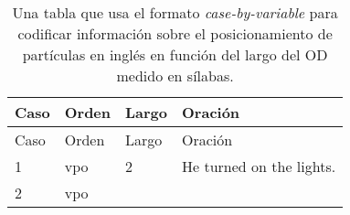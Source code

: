 \documentclass[authoryear,a4paper, 14pt]{scrartcl}
\begin{document}
\begin{longtable}[]{@{}llll@{}}
\caption{Una tabla que usa el formato \emph{case-by-variable} para codificar información sobre el
posicionamiento de partículas en inglés en función del largo del OD
medido en sílabas.}\tabularnewline
\toprule
\begin{minipage}[b]{0.08\columnwidth}\raggedright
Caso\strut
\end{minipage} & \begin{minipage}[b]{0.09\columnwidth}\raggedright
Orden\strut
\end{minipage} & \begin{minipage}[b]{0.09\columnwidth}\raggedright
Largo\strut
\end{minipage} & \begin{minipage}[b]{0.63\columnwidth}\raggedright
Oración\strut
\end{minipage}\tabularnewline
\midrule
\endfirsthead
\toprule
\begin{minipage}[b]{0.08\columnwidth}\raggedright
Caso\strut
\end{minipage} & \begin{minipage}[b]{0.09\columnwidth}\raggedright
Orden\strut
\end{minipage} & \begin{minipage}[b]{0.09\columnwidth}\raggedright
Largo\strut
\end{minipage} & \begin{minipage}[b]{0.63\columnwidth}\raggedright
Oración\strut
\end{minipage}\tabularnewline
\midrule
\endhead
\begin{minipage}[t]{0.08\columnwidth}\raggedright
1\strut
\end{minipage} & \begin{minipage}[t]{0.09\columnwidth}\raggedright
vpo\strut
\end{minipage} & \begin{minipage}[t]{0.09\columnwidth}\raggedright
2\strut
\end{minipage} & \begin{minipage}[t]{0.63\columnwidth}\raggedright
He turned on the lights.\strut
\end{minipage}\tabularnewline
\begin{minipage}[t]{0.08\columnwidth}\raggedright
2\strut
\end{minipage} & \begin{minipage}[t]{0.09\columnwidth}\raggedright
vpo\strut
\end{minipage} & \begin{minipage}[t]{0.09\columnwidth}\raggedright

\end{minipage}
\end{longtable}
\end{document}

